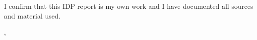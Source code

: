 \thispagestyle{empty}
\vspace*{0.8\textheight}
\noindent
I confirm that this IDP report is my own work and I have documented all sources and material used.

\vspace{15mm}
\noindent
\getSubmissionLocation{}, \getSubmissionDate{} \hspace{50mm} \getAuthor{}

\cleardoublepage{}
